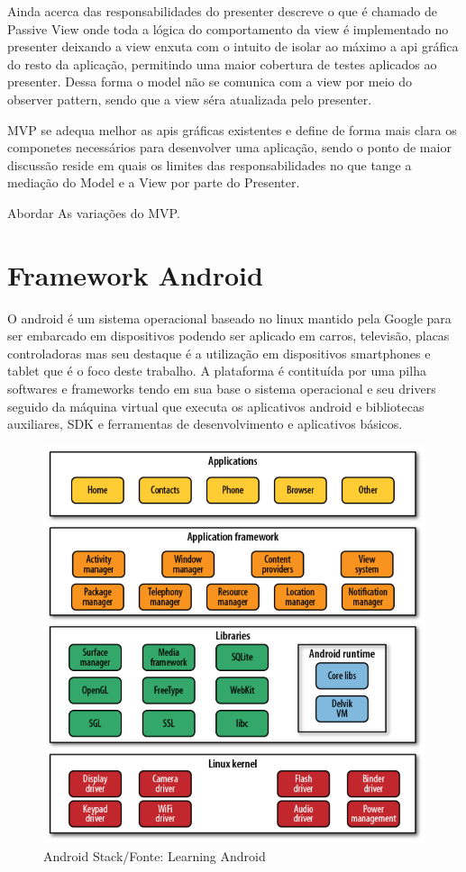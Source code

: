 Ainda acerca das responsabilidades do presenter  descreve
o que é chamado de Passive View onde toda a lógica do comportamento da view é
implementado no presenter deixando a view enxuta com o intuito de isolar ao
máximo a api gráfica do resto da aplicação, permitindo uma maior cobertura de
testes aplicados ao presenter. Dessa forma o model não se comunica com a view
por meio do observer pattern, sendo que a view séra atualizada pelo presenter.


MVP se adequa melhor as apis gráficas existentes e define de forma mais clara os
componetes necessários para desenvolver uma aplicação, sendo o ponto de maior
discussão reside em quais os limites das responsabilidades no que tange a
mediação do Model e a View por parte do Presenter.

Abordar As variações do MVP.

\section{Framework Android}
 

O android é um sistema operacional baseado no linux mantido pela Google para
ser embarcado em dispositivos podendo ser aplicado em carros, televisão, placas
controladoras mas seu destaque é a utilização em dispositivos smartphones e
tablet que é o foco deste trabalho.
A plataforma é contituída por uma pilha softwares e frameworks tendo em sua base
o sistema operacional e seu drivers seguido da máquina virtual que executa os
aplicativos android e bibliotecas auxiliares, SDK e ferramentas de
desenvolvimento e aplicativos básicos.

\begin{figure}[h]
	\centering
	\includegraphics[scale=0.5]{img/android_stack.png}
	\caption{Android Stack/Fonte: Learning Android}
	\label{android_stack}
\end{figure}

